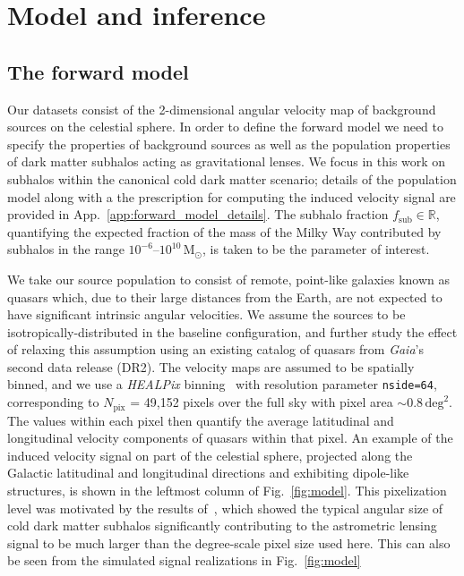 \documentclass[twocolumn]{aastex631}
\newcommand{\package}[1]{\textsl{#1}\xspace}
\newcommand{\healpix}{\package{HEALPix}}
\begin{document}
\section{Model and inference}
\label{sec:model}

\subsection{The forward model}
\label{sec:forward_model}

Our datasets consist of the 2-dimensional angular velocity map of background sources on the celestial sphere. {In order to define the forward model we need to specify the properties of background sources as well as the population properties of dark matter subhalos acting as gravitational lenses. We focus in this work on subhalos within the canonical cold dark matter scenario; details of the population model along with a the prescription for computing the induced velocity signal are provided in App.~\ref{app:forward_model_details}.} The subhalo fraction {$f_\mathrm{sub}\in \mathbb R$}, quantifying the expected fraction of the mass of the Milky Way contributed by subhalos in the range $10^{-6}$--$10^{10}\,\mathrm{M}_\odot$, is taken to be the parameter of interest.

We take our source population to consist of remote, point-like galaxies known as quasars which, due to their large distances from the Earth, are not expected to have significant intrinsic angular velocities. We assume the sources to be isotropically-distributed in the baseline configuration, {and further study the effect of relaxing this assumption using an existing catalog of quasars from \emph{Gaia}'s second data release (DR2)}. The velocity maps are assumed to be spatially binned, and we use  a \healpix binning~\citep{Gorski:2004by} with resolution parameter \texttt{nside=64}, corresponding to $N_\mathrm{pix}$ = 49,152 pixels over the full sky with pixel area $\sim 0.8\,\mathrm{deg}^2$. The values within each pixel then quantify the average latitudinal and longitudinal velocity components of quasars within that pixel. An example of the induced velocity signal on part of the celestial sphere, projected along the Galactic latitudinal and longitudinal directions and exhibiting dipole-like structures, is shown in the leftmost column of Fig.~\ref{fig:model}. {This pixelization level was motivated by the results of~\citet{Mishra-Sharma:2020ynk}, which showed the typical angular size of cold dark matter subhalos significantly contributing to the astrometric lensing signal to be much larger than the degree-scale pixel size used here. This can also be seen from the simulated signal realizations in Fig.~\ref{fig:model}}
\end{document}
